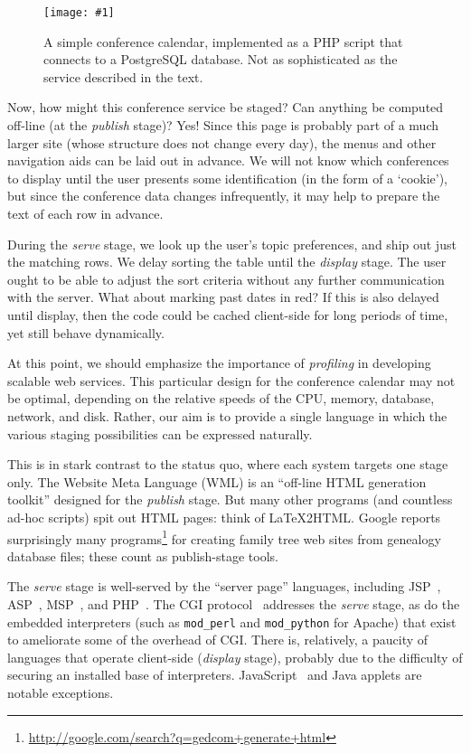 \documentclass[preprint]{acm_proc_article-sp}
\newcommand{\myfig}[3]{%
  \begin{figure}[tbp]%
    #3%
    \caption{#2}%
    \label{fig:#1}%
  \end{figure}}
\newcommand{\screenshot}[2]{%
  \myfig{#1}{#2}
  {\centering%
    \texttt{[image: \#1]}}}
\begin{document}
\screenshot{confcal}{A simple conference calendar, implemented as a
  PHP script that connects to a PostgreSQL database.  Not as
  sophisticated as the service described in the text.}

Now, how might this conference service be staged?  Can
anything be computed off-line (at the \emph{publish} stage)?
Yes!  Since this page is probably part of a much larger site
(whose structure does not change every day), the menus and
other navigation aids can be laid out in advance.  We will
not know which conferences to display until the user
presents some identification (in the form of a `cookie'),
but since the conference data changes infrequently, it may
help to prepare the text of each row in advance.

During the \emph{serve} stage, we look up the user's topic
preferences, and ship out just the matching rows.  We delay
sorting the table until the \emph{display} stage.  The user
ought to be able to adjust the sort criteria without any
further communication with the server.  What about marking
past dates in red?  If this is also delayed until display,
then the code could be cached client-side for long periods
of time, yet still behave dynamically.

At this point, we should emphasize the importance of
\emph{profiling} in developing scalable web services.  This
particular design for the conference calendar may not be
optimal, depending on the relative speeds of the CPU,
memory, database, network, and disk.  Rather, our aim is to
provide a single language in which the various staging
possibilities can be expressed naturally.

This is in stark contrast to the status quo, where each
system targets one stage only.  The Website Meta Language
(WML) \cite{engelschall-wml} is an ``off-line HTML
generation toolkit'' designed for the \emph{publish} stage.
But many other programs (and countless ad-hoc scripts) spit
out HTML pages: think of \LaTeX2HTML.  Google
reports surprisingly many
programs\footnote{\url{http://google.com/search?q=gedcom+generate+html}}
for creating family tree web sites from genealogy database
files; these count as publish-stage tools.

The \emph{serve} stage is well-served by the ``server page''
languages, including JSP~\cite{sun-jsp},
ASP~\cite{microsoft-asp},
MSP~\cite{elsman03web}, and
PHP~\cite{bakken04php}.  The CGI protocol~\cite{w3c-cgi}
addresses the \emph{serve} stage, as do the embedded
interpreters (such as \texttt{mod\_perl} and
\texttt{mod\_python} for Apache) that exist to ameliorate some
of the overhead of CGI.
There is, relatively, a paucity of languages that operate
client-side (\emph{display} stage), probably due to the
difficulty of securing an installed base of interpreters.
JavaScript~\cite{netscape-javascript} and Java applets are
notable exceptions.
\end{document}
